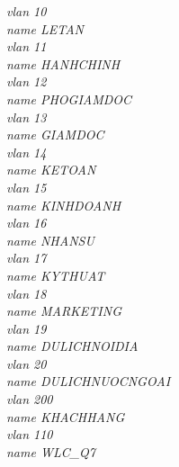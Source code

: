 \documentclass[a4paper, 12pt]{article}
\begin{document}
\hspace*{2cm}\textit{vlan 10\\
\hspace*{2cm}name LETAN\\
\hspace*{2cm}vlan 11\\
\hspace*{2cm}name HANHCHINH\\
\hspace*{2cm}vlan 12\\
\hspace*{2cm}name PHOGIAMDOC\\
\hspace*{2cm}vlan 13\\
\hspace*{2cm}name GIAMDOC\\
\hspace*{2cm}vlan 14\\
\hspace*{2cm}name KETOAN\\
\hspace*{2cm}vlan 15\\
\hspace*{2cm}name KINHDOANH\\
\hspace*{2cm}vlan 16\\
\hspace*{2cm}name NHANSU\\
\hspace*{2cm}vlan 17\\
\hspace*{2cm}name KYTHUAT\\
\hspace*{2cm}vlan 18\\
\hspace*{2cm}name MARKETING\\
\hspace*{2cm}vlan 19\\
\hspace*{2cm}name DULICHNOIDIA\\
\hspace*{2cm}vlan 20\\
\hspace*{2cm}name DULICHNUOCNGOAI\\
\hspace*{2cm}vlan 200\\
\hspace*{2cm}name KHACHHANG\\
\hspace*{2cm}vlan 110\\
\hspace*{2cm}name WLC\_Q7\\}
\end{document}
